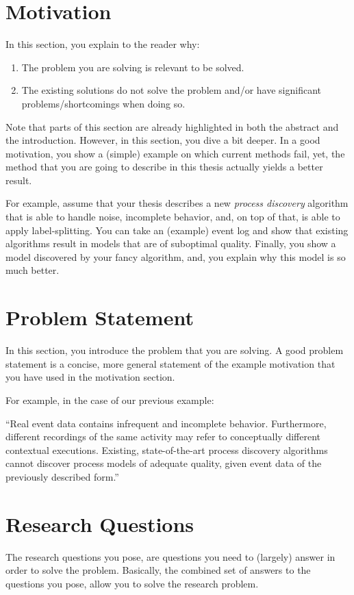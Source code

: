 \section{Motivation}
\label{sec:intro_ssec:motiv}
In this section, you explain to the reader why:
\begin{enumerate}
    \item The problem you are solving is relevant to be solved.
    \item The existing solutions do not solve the problem and/or have significant problems/shortcomings when doing so.
\end{enumerate}
Note that parts of this section are already highlighted in both the abstract and the introduction.
However, in this section, you dive a bit deeper.
In a good motivation, you show a (simple) example on which current methods fail, yet, the method that you are going to describe in this thesis actually yields a better result.

For example, assume that your thesis describes a new \emph{process discovery} algorithm that is able to handle noise, incomplete behavior, and, on top of that, is able to apply label-splitting.
You can take an (example) event log and show that existing algorithms result in models that are of suboptimal quality.
Finally, you show a model discovered by your fancy algorithm, and, you explain why this model is so much better.

\section{Problem Statement}
\label{sec:intro_ssec:probs}
In this section, you introduce the problem that you are solving.
A good problem statement is a concise, more general statement of the example motivation that you have used in the motivation section.

For example, in the case of our previous example:

\enquote{Real event data contains infrequent and incomplete behavior. 
Furthermore, different recordings of the same activity may refer to conceptually different contextual executions.
Existing, state-of-the-art process discovery algorithms cannot discover process models of adequate quality, given event data of the previously described form.}


\section{Research Questions}
The research questions you pose, are questions you need to (largely) answer in order to solve the problem.
Basically, the combined set of answers to the questions you pose, allow you to solve the research problem.

